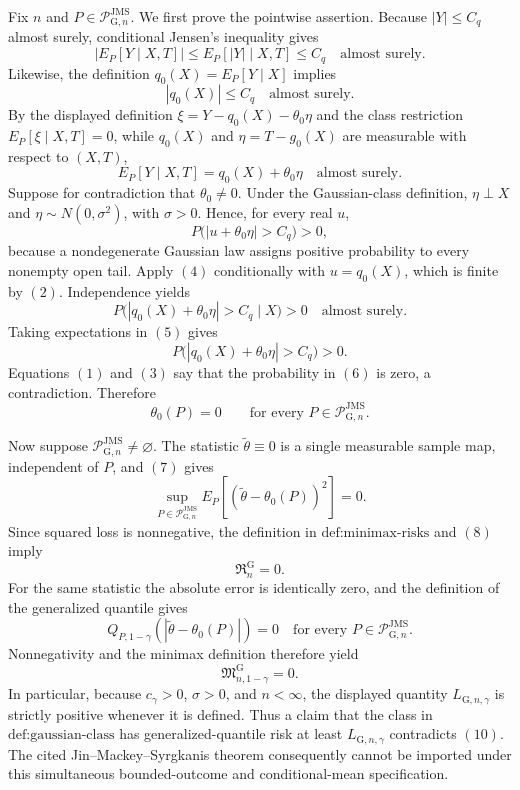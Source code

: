 Fix \(n\) and \(P\in\mathcal P_{\mathrm G,n}^{\mathrm{JMS}}\).  We first prove the pointwise assertion.  Because \(|Y|\le C_q\) almost surely, conditional Jensen's inequality gives
\[
 \left|E_P[Y\mid X,T]\right|
 \le E_P[|Y|\mid X,T]
 \le C_q
 \quad\text{almost surely}. \tag{1}
\]
Likewise, the definition \(q_0(X)=E_P[Y\mid X]\) implies
\[
 |q_0(X)|\le C_q
 \quad\text{almost surely}. \tag{2}
\]
By the displayed definition
\(
 \xi=Y-q_0(X)-\theta_0\eta
\)
and the class restriction \(E_P[\xi\mid X,T]=0\), while \(q_0(X)\) and \(\eta=T-g_0(X)\) are measurable with respect to \((X,T)\),
\[
 E_P[Y\mid X,T]=q_0(X)+\theta_0\eta
 \quad\text{almost surely}. \tag{3}
\]
Suppose for contradiction that \(\theta_0\ne0\).  Under the Gaussian-class definition, \(\eta\perp X\) and \(\eta\sim N(0,\sigma^2)\), with \(\sigma>0\).  Hence, for every real \(u\),
\[
 P\bigl(|u+\theta_0\eta|>C_q\bigr)>0, \tag{4}
\]
because a nondegenerate Gaussian law assigns positive probability to every nonempty open tail.  Apply \((4)\) conditionally with \(u=q_0(X)\), which is finite by \((2)\).  Independence yields
\[
 P\bigl(|q_0(X)+\theta_0\eta|>C_q\mid X\bigr)>0
 \quad\text{almost surely}. \tag{5}
\]
Taking expectations in \((5)\) gives
\[
 P\bigl(|q_0(X)+\theta_0\eta|>C_q\bigr)>0. \tag{6}
\]
Equations \((1)\) and \((3)\) say that the probability in \((6)\) is zero, a contradiction.  Therefore
\[
 \theta_0(P)=0
 \qquad\text{for every }P\in\mathcal P_{\mathrm G,n}^{\mathrm{JMS}}. \tag{7}
\]

Now suppose \(\mathcal P_{\mathrm G,n}^{\mathrm{JMS}}\ne\varnothing\).  The statistic \(\widetilde\theta\equiv0\) is a single measurable sample map, independent of \(P\), and \((7)\) gives
\[
 \sup_{P\in\mathcal P_{\mathrm G,n}^{\mathrm{JMS}}}
 E_P[(\widetilde\theta-\theta_0(P))^2]=0. \tag{8}
\]
Since squared loss is nonnegative, the definition in \(\text{def:minimax-risks}\) and \((8)\) imply
\[
 \mathfrak R_n^{\mathrm G}=0. \tag{9}
\]
For the same statistic the absolute error is identically zero, and the definition of the generalized quantile gives
\[
 Q_{P,1-\gamma}(|\widetilde\theta-\theta_0(P)|)=0
 \quad\text{for every }P\in\mathcal P_{\mathrm G,n}^{\mathrm{JMS}}.
\]
Nonnegativity and the minimax definition therefore yield
\[
 \mathfrak M_{n,1-\gamma}^{\mathrm G}=0. \tag{10}
\]
In particular, because \(c_\gamma>0\), \(\sigma>0\), and \(n<\infty\), the displayed quantity \(L_{\mathrm G,n,\gamma}\) is strictly positive whenever it is defined.  Thus a claim that the class in \(\text{def:gaussian-class}\) has generalized-quantile risk at least \(L_{\mathrm G,n,\gamma}\) contradicts \((10)\).  The cited Jin--Mackey--Syrgkanis theorem consequently cannot be imported under this simultaneous bounded-outcome and conditional-mean specification.